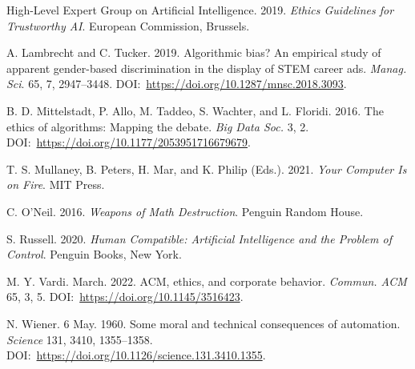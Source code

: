 \begin{thebibliography}{}
 High-Level Expert Group on Artificial Intelligence. 2019. \textit{Ethics Guidelines for Trustworthy AI}. European Commission, Brussels.

 A. Lambrecht and C. Tucker. 2019. Algorithmic bias? An empirical study of apparent gender-based discrimination in the display of STEM career ads. \textit{Manag. Sci}. 65, 7, 2947--3448. DOI:~\href{https://doi.org/10.1287/mnsc.2018.3093}{https://{\allowbreak}doi.{\allowbreak}org/{\allowbreak}10.{\allowbreak}1287/{\allowbreak}mnsc.{\allowbreak}2018.{\allowbreak}3093}.

 B. D. Mittelstadt, P. Allo, M. Taddeo, S. Wachter, and L. Floridi. 2016. The ethics of algorithms: Mapping the debate. \textit{Big Data Soc.} 3, 2. DOI:~\href{https://doi.org/10.1177/2053951716679679}{https://{\allowbreak}doi.{\allowbreak}org/{\allowbreak}10.{\allowbreak}1177/{\allowbreak}2053951716679679}.

 T. S. Mullaney, B. Peters, H. Mar, and K. Philip (Eds.). 2021. \textit{Your Computer Is on Fire}. MIT Press.

 C. O'Neil. 2016. \textit{Weapons of Math Destruction}. Penguin Random House.

 S. Russell. 2020. \textit{Human Compatible: Artificial Intelligence and the Problem of Control}. Penguin Books, New York.

 M. Y. Vardi. March. 2022. ACM, ethics, and corporate behavior. \textit{Commun. ACM} 65, 3, 5. DOI:~\href{https://doi.org/10.1145/3516423}{https://{\allowbreak}doi.{\allowbreak}org/{\allowbreak}10.{\allowbreak}1145/{\allowbreak}3516423}.

 N. Wiener. 6 May. 1960. Some moral and technical consequences of automation. \textit{Science} 131, 3410, 1355--1358. DOI:~\href{https://doi.org/10.1126/science.131.3410.1355}{https://{\allowbreak}doi.{\allowbreak}org/{\allowbreak}10.{\allowbreak}1126/{\allowbreak}science.{\allowbreak}131.{\allowbreak}3410.{\allowbreak}1355}.

\end{thebibliography}
%

